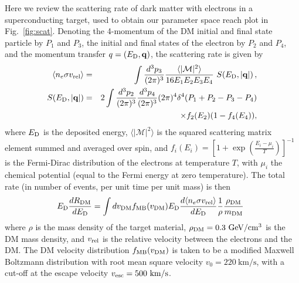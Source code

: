 \documentclass[twocolumn,10pt,prl,nofootinbib,preprintnumbers]{revtex4-1}
\begin{document}
Here we review the scattering rate of dark matter with electrons in a superconducting
target, used to obtain our parameter space reach plot in Fig.~\ref{fig:scat}. Denoting
the 4-momentum of the DM initial and final state particle by $P_1$ and $P_3$, the
initial and final states of the electron by $P_2$ and $P_4$, and the
momentum transfer $q=(E_{\rm D}, {\bf q})$, the scattering rate is given
by~\cite{Hochberg:2015pha,Hochberg:2015fth}
\begin{eqnarray}
 \label{eq:response}
 \langle n_e\sigma v_{\rm rel}\rangle&=&\int\frac{d^3
p_3}{(2\pi)^3}\frac{ \langle|\mathcal {M}|^2\rangle}{16 E_1 E_2 E_3 E_4}\ S(E_{\rm D},|{\bf q}|)\,,\\
S(E_{\rm D},|{\bf q}|)&=&2\int\frac{d^3 p_2}{(2\pi)^3}\frac{d^3
p_4}{(2\pi)^3}(2\pi)^4\delta^4(P_1+P_2-P_3-P_4)\nonumber\\
&&\quad \quad \quad \times f_2(E_2)(1-f_4(E_4)),\nonumber
\end{eqnarray}
where $E_{\rm D}$ is the deposited energy, $ \langle|\mathcal
{M}|^2\rangle $ is the squared scattering matrix element summed and
averaged over spin, and $f_i(E_i)=[
1+\exp(\frac{E_i-\mu_i}{T})]^{-1}$ is the Fermi-Dirac distribution
of the electrons at temperature $T$, with $\mu_i$ the chemical potential (equal to the Fermi energy at zero temperature). The total rate (in number of events, per unit time per unit mass) is then 
\begin{eqnarray}
 \label{eq:RateDM}
E_{\rm D}\frac{dR_{\rm DM}}{d E_{\rm D}}=\int d v_{\rm DM} f_{\rm MB}(v_{\rm DM})
E_{\rm D}\frac{d\langle n_e\sigma v_{\rm rel}\rangle}{d
E_{\rm D}}\frac{1}{\rho}\frac{\rho_{\rm DM}}{m_{\rm DM}}\,\,\,
\end{eqnarray}
where $\rho$ is the mass density of the target material, $\rho_{\rm DM} =
0.3\ \textrm{GeV}/\textrm{cm}^3$ is the DM mass density, and $v_{\rm rel}$ is the relative velocity between the electrons and the DM. The 
DM velocity distribution $ f_{\rm MB}(v_{\rm DM})$ is taken to be a modified Maxwell Boltzmann distribution with root mean square velocity $v_0=220\ \textrm{km}/\textrm{s}$,
with a cut-off at the escape velocity $v_{\rm esc}=500\ \textrm{km}/\textrm{s}$. 
\end{document}
